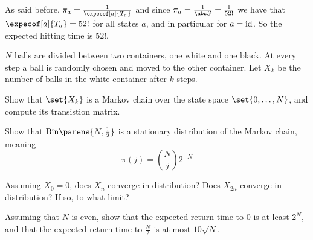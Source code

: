     \item As said before, $\pi_a=\frac1{\expecof[a]{T_a}}$ and since $\pi_a=\frac1{\abs S}=\frac1{52!}$ we have that $\expecof[a]{T_a}=52!$ for all states $a$, and in particular for $a={\rm id}$.
    So the expected hitting time is $52!$.
\eenum

\bexerc

    $N$ balls are divided between two containers, one white and one black.
    At every step a ball is randomly chosen and moved to the other container.
    Let $X_k$ be the number of balls in the white container after $k$ steps.
    \benum
        \item Show that $\set{X_k}$ is a Markov chain over the state space $\set{0,\dots,N}$, and compute its transistion matrix.
        \item Show that ${\rm Bin}\parens{N,\frac12}$ is a stationary distribution of the Markov chain, meaning
        $$ \pi(j) = \binom{N}{j}2^{-N} $$
        \item Assuming $X_0=0$, does $X_n$ converge in distribution?
        Does $X_{2n}$ converge in distribution?
        If so, to what limit?
        \item Assuming that $N$ is even, show that the expected return time to $0$ is at least $2^N$, and that the expected return time to $\frac N2$ is at most $10\sqrt N$.
    \eenum

\eexerc

